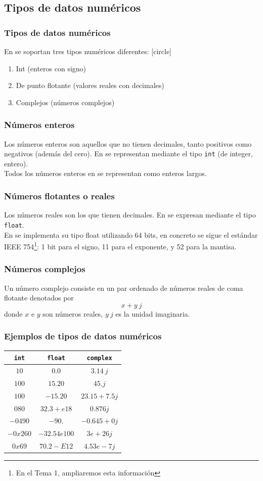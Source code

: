 {\subsection{Tipos de datos numéricos}
\begin{frame}
\frametitle{Tipos de datos numéricos}
En \python{} se soportan tres tipos numéricos diferentes:
[circle]
\begin{enumerate}[<+->]
\item Int (enteros con signo)
\item De punto flotante (valores reales con decimales)
\item Complejos (números complejos)
\end{enumerate}
\end{frame}
\begin{frame}
\frametitle{Números enteros}
Los números enteros son aquellos que no tienen decimales, tanto positivos como negativos (además del cero). En \python{} se representan mediante el tipo \texttt{int} (de integer, entero).
\\
\bigskip
Todos los números enteros en  se representan como enteros largos.
\end{frame}
\begin{frame}
\frametitle{Números flotantes o reales}
Los números reales son los que tienen decimales. En \python{} se expresan mediante el tipo \texttt{float}.
\\
\bigskip
En \python{} se implementa su tipo float utilizando 64 bits, en concreto se sigue el estándar IEEE 754\footnote{En el Tema 1, ampliaremos esta información}: 1 bit para el signo, 11 para el exponente, y 52 para la mantisa.
\end{frame}
\begin{frame}
\frametitle{Números complejos}
Un número complejo consiste en un par ordenado de números reales de coma flotante denotados por
\[ x + y \: j\]
donde $x$ e $y$ son números reales, $y \: j$ es la unidad imaginaria.
\end{frame}
\begin{frame}
\frametitle{Ejemplos de tipos de datos numéricos}
\begin{table}
\begin{tabular}{| c | c | c |}
\hline
\texttt{int} & \texttt{float} & \texttt{complex} \\ \hline
$10$ & $0.0$ & $3.14 \: j$ \\ \hline
$100$ & $15.20$ & $45.j$ \\ \hline
$100$ & $-15.20$ & $23.15+7.5j$ \\ \hline
$080$ & $32.3+e18$ & $0.876j$ \\ \hline
$-0490$ & $-90.$ & $-0.645+0j$ \\ \hline
$-0x260$ & $-32.54e100$ & $3e+26j$ \\ \hline
$0x69$ & $70.2-E12$ & $4.53e-7j$ \\ \hline
\end{tabular}
\end{table}    
\end{frame}
}
